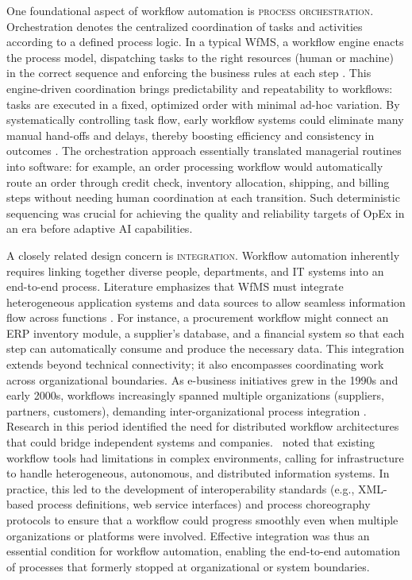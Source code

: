 One foundational aspect of workflow automation is \textsc{process orchestration}. Orchestration denotes the centralized coordination of tasks and activities according to a defined process logic. In a typical WfMS, a workflow engine enacts the process model, dispatching tasks to the right resources (human or machine) in the correct sequence and enforcing the business rules at each step \parencite{basuResearch2002}. This engine-driven coordination brings predictability and repeatability to workflows: tasks are executed in a fixed, optimized order with minimal ad-hoc variation. By systematically controlling task flow, early workflow systems could eliminate many manual hand-offs and delays, thereby boosting efficiency and consistency in outcomes \parencite{stohrWorkflow2001}. The orchestration approach essentially translated managerial routines into software: for example, an order processing workflow would automatically route an order through credit check, inventory allocation, shipping, and billing steps without needing human coordination at each transition. Such deterministic sequencing was crucial for achieving the quality and reliability targets of OpEx in an era before adaptive AI capabilities.

A closely related design concern is \textsc{integration}. Workflow automation inherently requires linking together diverse people, departments, and IT systems into an end-to-end process. Literature emphasizes that WfMS must integrate heterogeneous application systems and data sources to allow seamless information flow across functions \parencite{stohrWorkflow2001}. For instance, a procurement workflow might connect an ERP inventory module, a supplier's database, and a financial system so that each step can automatically consume and produce the necessary data. This integration extends beyond technical connectivity; it also encompasses coordinating work across organizational boundaries. As e-business initiatives grew in the 1990s and early 2000s, workflows increasingly spanned multiple organizations (suppliers, partners, customers), demanding inter-organizational process integration \parencite{basuResearch2002}. Research in this period identified the need for distributed workflow architectures that could bridge independent systems and companies.~\textcite{georgakopoulosOverview1995} noted that existing workflow tools had limitations in complex environments, calling for infrastructure to handle heterogeneous, autonomous, and distributed information systems. In practice, this led to the development of interoperability standards (e.g., XML-based process definitions, web service interfaces) and process choreography protocols to ensure that a workflow could progress smoothly even when multiple organizations or platforms were involved. Effective integration was thus an essential condition for workflow automation, enabling the end-to-end automation of processes that formerly stopped at organizational or system boundaries.


